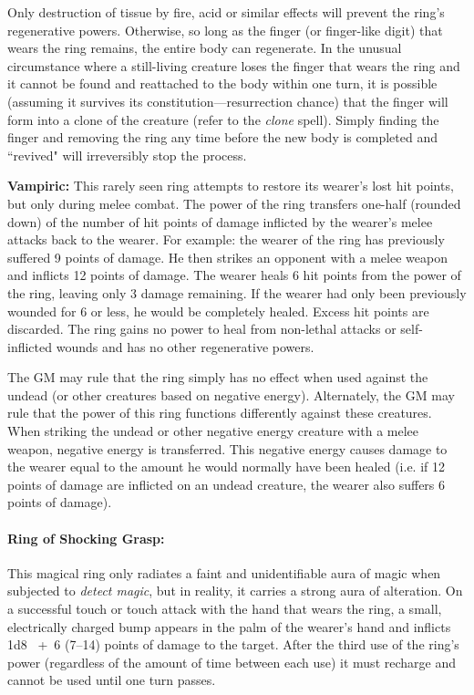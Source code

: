 \begin{multicols}{2}
Only destruction of tissue by fire, acid or similar effects will prevent the ring's regenerative powers. Otherwise, so long as the finger (or finger-like digit) that wears the ring remains, the entire body can regenerate.  In the unusual circumstance where a still-living creature loses the finger that wears the ring and it cannot be found and reattached to the body within one turn, it is possible (assuming it survives its constitution---resurrection chance) that the finger will form into a clone of the creature (refer to the \textit{clone} spell).  Simply finding the finger and removing the ring any time before the new body is completed and ``revived" will irreversibly stop the process.

\textbf{Vampiric:} This rarely seen ring attempts to restore its wearer's lost hit points, but only during melee combat.  The power of the ring transfers one-half (rounded down) of the number of hit points of damage inflicted by the wearer's melee attacks back to the wearer.  For example: the wearer of the ring has previously suffered 9 points of damage.  He then strikes an opponent with a melee weapon and inflicts 12 points of damage.  The wearer heals 6 hit points from the power of the ring, leaving only 3 damage remaining.  If the wearer had only been previously wounded for 6 or less, he would be completely healed.  Excess hit points are discarded.  The ring gains no power to heal from non-lethal attacks or self-inflicted wounds and has no other regenerative powers.

The GM may rule that the ring simply has no effect when used against the undead (or other creatures based on negative energy).  Alternately, the GM may rule that the power of this ring functions differently against these creatures.  When striking the undead or other negative energy creature with a melee weapon, negative energy is transferred.  This negative energy causes damage to the wearer equal to the amount he would normally have been healed (i.e. if 12 points of damage are inflicted on an undead creature, the wearer also suffers 6 points of damage).

\paragraph{Ring of Shocking Grasp:}  This magical ring only radiates a faint and unidentifiable aura of magic when subjected to \textit{detect magic}, but in reality, it carries a strong aura of alteration.  On a successful touch or touch attack with the hand that wears the ring, a small, electrically charged bump appears in the palm of the wearer's hand and inflicts 1d8 ~+~6 (7--14) points of damage to the target.  After the third use of the ring's power (regardless of the amount of time between each use) it must recharge and cannot be used until one turn passes.


\end{multicols}
